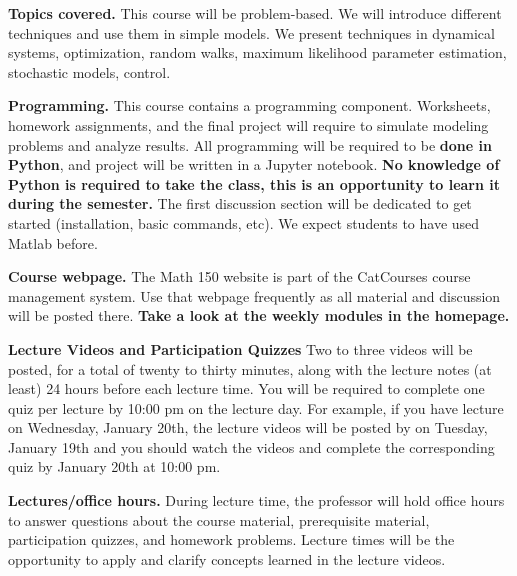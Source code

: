\documentclass{article}
\newcommand{\secskip}{\vspace{6pt}}
\begin{document}
\secskip

\textbf{Topics covered.} This course will be problem-based. We will introduce different techniques and use them in simple models. We present techniques in dynamical systems, optimization, random walks, maximum likelihood parameter estimation, stochastic models, control.

\secskip

\textbf{Programming.} This course contains a programming component. Worksheets, homework assignments, and the final project will require to simulate modeling problems and analyze results. All programming will be required to be \textbf{done in Python}, and project will be written in a Jupyter notebook. \textbf{No knowledge of Python is required to take the class, this is an opportunity to learn it during the semester.} The first discussion section will be dedicated to get started (installation, basic commands, etc). We expect students to have used Matlab before. 

\secskip

\textbf{Course webpage.} The Math 150 website is part of the CatCourses course management system. Use that webpage frequently as all material and discussion will be posted there. \textbf{Take a look at the weekly modules in the homepage.}

\secskip

\textbf{Lecture Videos and Participation Quizzes} 
Two to three videos will be posted, for a total of twenty to thirty minutes, along with the lecture notes (at least) 24 hours before each lecture time. You will be required to complete one quiz per lecture by 10:00 pm on the lecture day.
For example, if you have lecture on Wednesday, January 20th, the lecture videos will be posted by on Tuesday, January 19th and you should watch the videos and complete the corresponding quiz by January 20th at 10:00 pm. 

\secskip

\textbf{Lectures/office hours.} 
During lecture time, the professor will hold office hours to answer questions about the course material, prerequisite material, participation quizzes, and homework problems. Lecture times will be the opportunity to apply and clarify concepts learned in the lecture videos.
\end{document}
